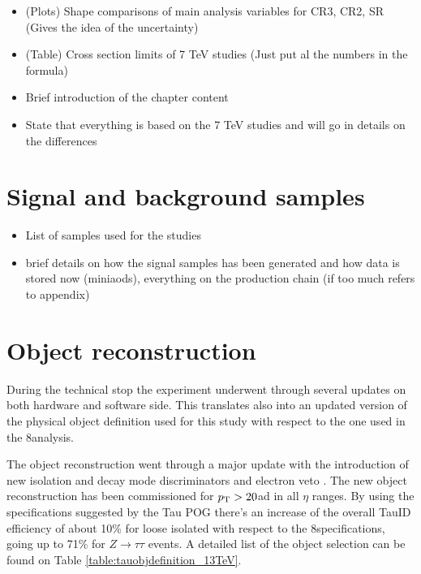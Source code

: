 
\begin{itemize}
	\item (Plots) Shape comparisons of main analysis variables for CR3, CR2, SR (Gives the idea of the uncertainty)
	\item (Table) Cross section limits of 7 TeV studies (Just put al the numbers in the formula)
\end{itemize}

\begin{itemize}
	\item Brief introduction of the chapter content
	\item State that everything is based on the 7 TeV studies and will go in details on the differences
\end{itemize}



\section{Signal and background samples}
\label{sec::samples_13tev}
\begin{itemize}
	\item List of samples used for the studies
	\item brief details on how the signal samples has been generated and how data is stored now (miniaods), everything on the production chain (if too much refers to appendix)
\end{itemize}



\section{Object reconstruction}

During the technical stop the experiment underwent through several updates on both hardware and software side. This	translates also into an updated version of the physical object definition used for this study with respect to the one used in the 8\tev analysis.

The \hadtau object reconstruction went through a major update with the introduction of new isolation and decay mode discriminators and electron veto \cite{bib:TauID_13tev}. The new \hadtau object reconstruction has been commissioned for $p_{\text{T}} > 20$\gev ad in all $\eta$ ranges. By using the specifications suggested by the Tau POG there's an increase of the overall TauID efficiency of about 10\% for loose isolated \hadtau with respect to the 8\tev specifications, going up to 71\% for $Z \longrightarrow\tau\tau$ events\cite{bib:TauID_13tev}. A detailed list of the \hadtau object selection can be found on Table \ref{table:tauobjdefinition_13TeV}. 


